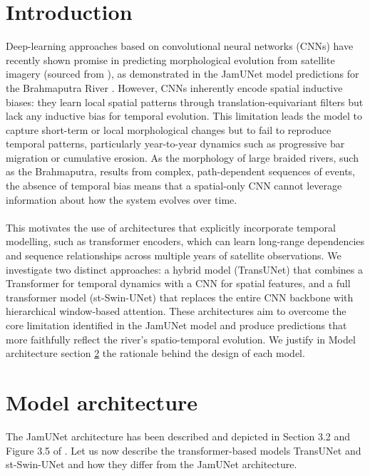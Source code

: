 \documentclass[10pt,oneside,a4paper,english]{article}
\begin{document}
\section{Introduction} \label{section: Introduction}
Deep-learning approaches based on convolutional neural networks (CNNs) have recently shown promise in predicting morphological evolution from satellite imagery (sourced from \cite{pekel2016high}), as demonstrated in the JamUNet model predictions for the Brahmaputra River \cite{magherini2024jamunet}. However, CNNs inherently encode spatial inductive biases: they learn local spatial patterns through translation-equivariant filters but lack any inductive bias for temporal evolution. This limitation leads the model to capture short-term or local morphological changes but to fail to reproduce temporal patterns, particularly year-to-year dynamics such as progressive bar migration or cumulative erosion. As the morphology of large braided rivers, such as the Brahmaputra, results from complex, path-dependent sequences of events, the absence of temporal bias means that a spatial-only CNN cannot leverage information about how the system evolves over time. \\
\\
This motivates the use of architectures that explicitly incorporate temporal modelling, such as transformer encoders, which can learn long-range dependencies and sequence relationships across multiple years of satellite observations. We investigate two distinct approaches: a hybrid model (TransUNet) that combines a Transformer for temporal dynamics with a CNN for spatial features, and a full transformer model (st-Swin-UNet) that replaces the entire CNN backbone with hierarchical window-based attention. These architectures aim to overcome the core limitation identified in the JamUNet model and produce predictions that more faithfully reflect the river's spatio-temporal evolution. We justify in Model architecture section \ref{section: Model architecture} the rationale behind the design of each model.


\section{Model architecture} \label{section: Model architecture}
The JamUNet architecture has been described and depicted in Section 3.2 and Figure 3.5 of \cite{magherini2024jamunet}. Let us now describe the transformer-based models TransUNet and st-Swin-UNet and how they differ from the JamUNet architecture. 
\end{document}
